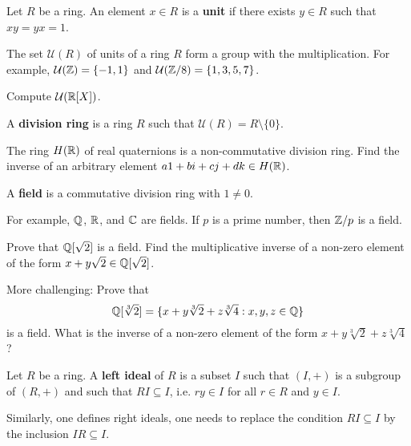 \begin{definition}
	Let $R$ be a ring. An element $x\in R$ is 
	a \textbf{unit} if there exists $y\in R$ such that $xy=yx=1$. 
\end{definition}

The set $\mathcal{U}(R)$ of units of a ring $R$ form 
a group with the multiplication. For example, $\mathcal{U}(\mathbb{Z})=\{-1,1\}$ and 
$\mathcal{U}(\mathbb{Z}/8)=\{1,3,5,7\}$. 

\begin{exercise}
\label{xca:units_R[X]}
Compute $\mathcal{U}(\mathbb{R}[X])$.
\end{exercise}

\begin{definition}
	A \textbf{division ring} is a ring $R$ 
	such that $\mathcal{U}(R)=R\setminus\{0\}$.  	
\end{definition}

The ring $H(\mathbb{R})$ of real quaternions is a non-commutative division ring. Find the inverse of
an arbitrary element $a1+bi+cj+dk\in H(\mathbb{R})$. 

\begin{definition}
	A \textbf{field} is a commutative division ring with $1\ne 0$. 
\end{definition}

For example, $\mathbb{Q}$, $\mathbb{R}$, and $\mathbb{C}$ are fields. 
If $p$ is a prime number, then $\mathbb{Z}/p$ is a field. 	

\begin{exercise}
	Prove that $\mathbb{Q}[\sqrt{2}]$ is a field. 
	Find the multiplicative inverse of a non-zero element of the form 
	$x+y\sqrt{2}\in\mathbb{Q}[\sqrt{2}]$.  
\end{exercise}

More challenging: Prove that 
\[
\mathbb{Q}[\sqrt[3]{2}]=\{x+y\sqrt[3]{2}+z\sqrt[3]{4}:x,y,z\in\mathbb{Q}\}
\]
is a field. What is the inverse of a non-zero element of the form $x+y\sqrt[3]{2}+z\sqrt[3]{4}$?


\begin{definition}
	Let $R$ be a ring. A \textbf{left ideal} of $R$ is a subset $I$ such that 
	$(I,+)$ is a subgroup of $(R,+)$ and such that $RI\subseteq I$, 
	i.e. $ry\in I$ for all $r\in R$ and $y\in I$. 
\end{definition}

Similarly, one defines right ideals, one needs 
to replace the condition $RI\subseteq I$ by 
the inclusion 
$IR\subseteq I$. 


